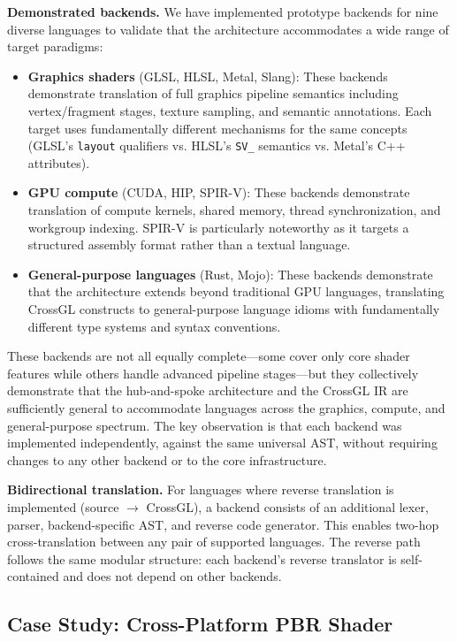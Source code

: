 \documentclass{svproc}
\begin{document}
\textbf{Demonstrated backends.} We have implemented prototype backends for nine diverse languages to validate that the architecture accommodates a wide range of target paradigms:

\begin{itemize}
\item \textbf{Graphics shaders} (GLSL, HLSL, Metal, Slang): These backends demonstrate translation of full graphics pipeline semantics including vertex/fragment stages, texture sampling, and semantic annotations. Each target uses fundamentally different mechanisms for the same concepts (GLSL's \texttt{layout} qualifiers vs. HLSL's \texttt{SV\_} semantics vs. Metal's C++ attributes).
\item \textbf{GPU compute} (CUDA, HIP, SPIR-V): These backends demonstrate translation of compute kernels, shared memory, thread synchronization, and workgroup indexing. SPIR-V is particularly noteworthy as it targets a structured assembly format rather than a textual language.
\item \textbf{General-purpose languages} (Rust, Mojo): These backends demonstrate that the architecture extends beyond traditional GPU languages, translating CrossGL constructs to general-purpose language idioms with fundamentally different type systems and syntax conventions.
\end{itemize}

These backends are not all equally complete---some cover only core shader features while others handle advanced pipeline stages---but they collectively demonstrate that the hub-and-spoke architecture and the CrossGL IR are sufficiently general to accommodate languages across the graphics, compute, and general-purpose spectrum. The key observation is that each backend was implemented independently, against the same universal AST, without requiring changes to any other backend or to the core infrastructure.

\textbf{Bidirectional translation.} For languages where reverse translation is implemented (source $\rightarrow$ CrossGL), a backend consists of an additional lexer, parser, backend-specific AST, and reverse code generator. This enables two-hop cross-translation between any pair of supported languages. The reverse path follows the same modular structure: each backend's reverse translator is self-contained and does not depend on other backends.

\subsection{Case Study: Cross-Platform PBR Shader}
\end{document}
